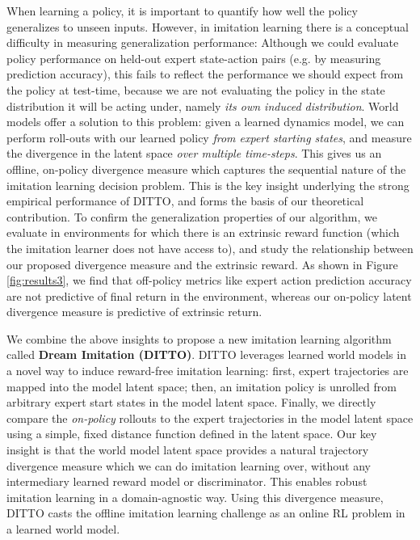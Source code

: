 \documentclass[10pt]{article} %
\theoremstyle{plain}
\theoremstyle{definition}
\theoremstyle{remark}
\begin{document}
When learning a policy, it is important to quantify how well the policy generalizes to unseen inputs. However, in imitation learning there is a conceptual difficulty in measuring generalization performance: Although we could evaluate policy performance on held-out expert state-action pairs (e.g. by measuring prediction accuracy), this fails to reflect the performance we should expect from the policy at test-time, because we are not evaluating the policy in the state distribution it will be acting under, namely \textit{its own induced distribution}. World models offer a solution to this problem: given a learned dynamics model, we can perform roll-outs with our learned policy \textit{from expert starting states}, and measure the divergence in the latent space \textit{over multiple time-steps}. This gives us an offline, on-policy divergence measure which captures the sequential nature of the imitation learning decision problem. This is the key insight underlying the strong empirical performance of DITTO, and forms the basis of our theoretical contribution. To confirm the generalization properties of our algorithm, we evaluate in environments for which there is an extrinsic reward function (which the imitation learner does not have access to), and study the relationship between our proposed divergence measure and the extrinsic reward. As shown in Figure \ref{fig:results3}, we find that off-policy metrics like expert action prediction accuracy are not predictive of final return in the environment, whereas our on-policy latent divergence measure is predictive of extrinsic return.



We combine the above insights to propose a new imitation learning algorithm called \textbf{Dream Imitation (DITTO)}.
%
DITTO leverages learned world models in a novel way to induce reward-free imitation learning: first, expert trajectories are mapped into the model latent space; then, an imitation policy is unrolled from arbitrary expert start states in the model latent space. Finally, we directly compare the \emph{on-policy} rollouts to the expert trajectories in the model latent space using a simple, fixed distance function defined in the latent space. Our key insight is that the world model latent space provides a natural trajectory divergence measure which we can do imitation learning over, without any intermediary learned reward model or discriminator. This enables robust imitation learning in a domain-agnostic way. Using this divergence measure, DITTO casts the offline imitation learning challenge as an online RL problem in a learned world model.
\end{document}

